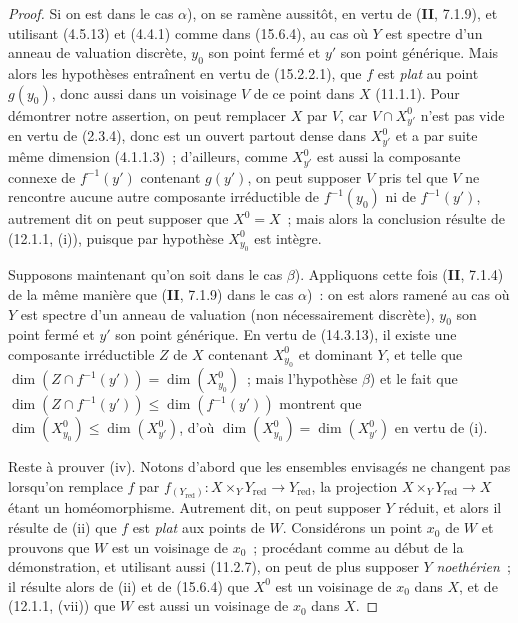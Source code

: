 \begin{proof}
Si on est dans le cas $\alpha$), on se ramène aussitôt, en vertu de (\textbf{II}, 7.1.9), et utilisant (4.5.13) et (4.4.1) comme dans (15.6.4), au cas où $Y$ est spectre d'un anneau de valuation discrète, $y_0$ son point fermé et $y'$ son point générique. Mais alors les hypothèses entraînent en vertu de (15.2.2.1), que $f$ est \emph{plat} au point $g(y_0)$, donc aussi dans un voisinage $V$ de ce point dans $X$ (11.1.1). Pour démontrer notre assertion, on peut remplacer $X$ par $V$, car $V\cap X_{y'}^0$ n'est pas vide en vertu de (2.3.4), donc est un ouvert partout dense dans $X_{y'}^0$ et a par suite même dimension (4.1.1.3)~; d'ailleurs, comme $X_{y'}^0$ est aussi la composante connexe de $f^{-1}(y')$ contenant $g(y')$, on peut supposer $V$ pris tel que $V$ ne rencontre aucune autre composante irréductible de $f^{-1}(y_0)$ ni de $f^{-1}(y')$, autrement dit on peut supposer que $X^0=X$~; mais alors la conclusion résulte de (12.1.1, (i)), puisque par hypothèse $X_{y_0}^0$ est intègre.

Supposons maintenant qu'on soit dans le cas $\beta$). Appliquons cette fois (\textbf{II}, 7.1.4) de la même manière que (\textbf{II}, 7.1.9) dans le cas $\alpha$)~: on est alors ramené au cas où $Y$ est spectre d'un anneau de valuation (non nécessairement discrète), $y_0$ son point fermé et $y'$ son point générique. En vertu de (14.3.13), il existe une composante irréductible $Z$ de $X$ contenant $X_{y_0}^0$ et dominant $Y$, et telle que $\dim(Z\cap f^{-1}(y'))=\dim(X_{y_0}^0)$~; mais l'hypothèse $\beta$) et le fait que $\dim(Z\cap f^{-1}(y'))\leqslant\dim(f^{-1}(y'))$ montrent que $\dim(X_{y_0}^0)\leqslant\dim(X_{y'}^0)$, d'où $\dim(X_{y_0}^0)=\dim(X_{y'}^0)$ en vertu de (i).

Reste à prouver (iv). Notons d'abord que les ensembles envisagés ne changent pas lorsqu'on remplace $f$ par $f_{(Y_{\mathrm{red}})}:X\times_Y Y_{\mathrm{red}}\to Y_{\mathrm{red}}$, la projection $X\times_Y Y_{\mathrm{red}}\to X$ étant un homéomorphisme. Autrement dit, on peut supposer $Y$ réduit, et alors il résulte de (ii) que $f$ est \emph{plat} aux points de $W$. Considérons un point $x_0$ de $W$ et prouvons que $W$ est un voisinage de $x_0$~; procédant comme au début de la démonstration, et utilisant aussi (11.2.7), on peut de plus supposer $Y$ \emph{noethérien}~; il résulte alors de (ii) et de (15.6.4) que $X^0$ est un voisinage de $x_0$ dans $X$, et de (12.1.1, (vii)) que $W$ est aussi un voisinage de $x_0$ dans $X$.
\end{proof}

